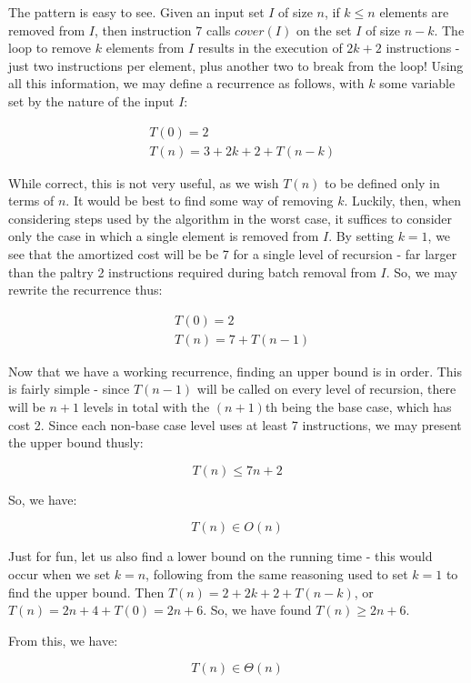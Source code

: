 \documentclass{article}
\begin{document}
The pattern is easy to see. Given an input set $I$ of size $n$, if $k \leq n$
elements are removed from $I$, then instruction 7 calls $cover(I)$ on the set
$I$ of size $n-k$. The loop to remove $k$ elements from $I$ results in the
execution of $2k+2$ instructions - just two instructions per element, plus
another two to break from the loop! Using all this information, we may define a
recurrence as follows, with $k$ some variable set by the nature of the input
$I$:

\begin{align*}
&T(0) = 2 \\
&T(n) = 3 + 2k + 2 + T(n-k)
\end{align*}

While correct, this is not very useful, as we wish $T(n)$ to be defined only in
terms of $n$. It would be best to find some way of removing $k$. Luckily, then,
when considering steps used by the algorithm in the worst case, it suffices to
consider only the case in which a single element is removed from $I$. By
setting $k=1$, we see that the amortized cost will be be 7 for a single level of
recursion - far larger than the paltry 2 instructions required during batch
removal from $I$. So, we may rewrite the recurrence thus:

\begin{align*}
&T(0) = 2 \\
&T(n) = 7 + T(n-1)
\end{align*} 

Now that we have a working recurrence, finding an upper bound is in order. This
is fairly simple - since $T(n-1)$ will be called on every level of recursion,
there will be $n+1$ levels in total with the $(n+1)$th being the base case,
which has cost 2. Since each non-base case level uses at least 7 instructions,
we may present the upper bound thusly:

\begin{equation*}
T(n) \leq 7n + 2
\end{equation*}

So, we have:

\begin{equation*}
T(n) \in O(n)
\end{equation*}

Just for fun, let us also find a lower bound on the running time - this would
occur when we set $k = n$, following from the same reasoning used to set $k=1$
to find the upper bound. Then $T(n) = 2 + 2k + 2 + T(n-k)$, or $T(n) = 2n + 4 +
T(0) = 2n + 6$. So, we have found $T(n) \geq 2n+6$.

From this, we have:

\begin{equation*}
T(n) \in \Theta(n)
\end{equation*}
\end{document}
